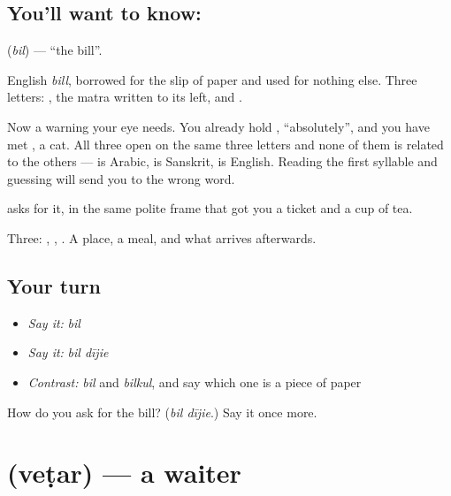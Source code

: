 \subsection*{You'll want to know: }
\textbf{} (\emph{bil}) — \textquotedblleft{}the bill\textquotedblright{}.

English \emph{bill}, borrowed for the slip of paper and used for nothing else. Three letters: , the  matra written to its left, and .

Now a warning your eye needs. You already hold \textbf{}, \textquotedblleft{}absolutely\textquotedblright{}, and you have met \textbf{}, a cat. All three open on the same three letters and none of them is related to the others —  is Arabic,  is Sanskrit,  is English. Reading the first syllable and guessing will send you to the wrong word.

\textbf{ } asks for it, in the same polite frame that got you a ticket and a cup of tea.

\begin{grammarlens}[title={What you've built}]
Three: , , . A place, a meal, and what arrives afterwards.
\end{grammarlens}

\subsection*{Your turn}
\begin{itemize}
\raggedright
  \item \emph{Say it:} \emph{bil}
  \item \emph{Say it:} \emph{bil dījie}
  \item \emph{Contrast:} \emph{bil} and \emph{bilkul}, and say which one is a piece of paper
\end{itemize}

\begin{tcolorbox}[breakable,colback=teal!4,colframe=teal!35!black,title={Before you move on}]
How do you ask for the bill? (\emph{bil dījie}.) Say it once more.
\end{tcolorbox}
\section[veṭar]{ (veṭar) — a waiter}

\label{lesson:HI-C73-waiter}



